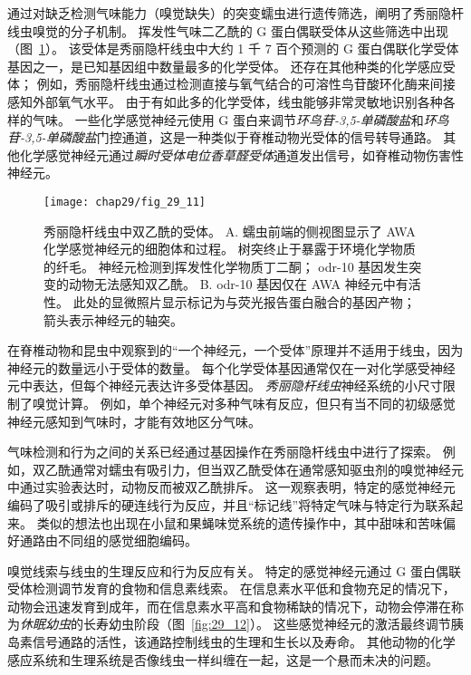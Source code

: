通过对缺乏检测气味能力（嗅觉缺失）的突变蠕虫进行遗传筛选，阐明了秀丽隐杆线虫嗅觉的分子机制。
挥发性气味二乙酰的 G 蛋白偶联受体从这些筛选中出现（图~\ref{fig:29_11}）。
该受体是秀丽隐杆线虫中大约 1 千 7 百个预测的 G 蛋白偶联化学受体基因之一，是已知基因组中数量最多的化学受体。
还存在其他种类的化学感应受体；
例如，秀丽隐杆线虫通过检测直接与氧气结合的可溶性鸟苷酸环化酶来间接感知外部氧气水平。
由于有如此多的化学受体，线虫能够非常灵敏地识别各种各样的气味。
一些化学感觉神经元使用 G 蛋白来调节\textit{环鸟苷-3,5-单磷酸盐}和\textit{环鸟苷-3,5-单磷酸盐}门控通道，这是一种类似于脊椎动物光受体的信号转导通路。
其他化学感觉神经元通过\textit{瞬时受体电位香草醛受体}通道发出信号，如脊椎动物伤害性神经元。


\begin{figure}[htbp]
	\centering
	\texttt{[image: chap29/fig\_29\_11]}
	\caption{秀丽隐杆线虫中双乙酰的受体。
		A. 蠕虫前端的侧视图显示了 AWA 化学感觉神经元的细胞体和过程。
		树突终止于暴露于环境化学物质的纤毛。
		神经元检测到挥发性化学物质丁二酮；
		odr-10 基因发生突变的动物无法感知双乙酰。
		B. odr-10 基因仅在 AWA 神经元中有活性。
		此处的显微照片显示标记为与荧光报告蛋白融合的基因产物；
		箭头表示神经元的轴突。}
	\label{fig:29_11}
\end{figure}


在脊椎动物和昆虫中观察到的“一个神经元，一个受体”原理并不适用于线虫，因为神经元的数量远小于受体的数量。
每个化学受体基因通常仅在一对化学感受神经元中表达，但每个神经元表达许多受体基因。
\textit{秀丽隐杆线虫}神经系统的小尺寸限制了嗅觉计算。
例如，单个神经元对多种气味有反应，但只有当不同的初级感觉神经元感知到气味时，才能有效地区分气味。


气味检测和行为之间的关系已经通过基因操作在秀丽隐杆线虫中进行了探索。
例如，双乙酰通常对蠕虫有吸引力，但当双乙酰受体在通常感知驱虫剂的嗅觉神经元中通过实验表达时，动物反而被双乙酰排斥。
这一观察表明，特定的感觉神经元编码了吸引或排斥的硬连线行为反应，并且“标记线”将特定气味与特定行为联系起来。
类似的想法也出现在小鼠和果蝇味觉系统的遗传操作中，其中甜味和苦味偏好通路由不同组的感觉细胞编码。


嗅觉线索与线虫的生理反应和行为反应有关。
特定的感觉神经元通过 G 蛋白偶联受体检测调节发育的食物和信息素线索。
在信息素水平低和食物充足的情况下，动物会迅速发育到成年，而在信息素水平高和食物稀缺的情况下，动物会停滞在称为\textit{休眠幼虫}的长寿幼虫阶段（图~\ref{fig:29_12}）。
这些感觉神经元的激活最终调节胰岛素信号通路的活性，该通路控制线虫的生理和生长以及寿命。
其他动物的化学感应系统和生理系统是否像线虫一样纠缠在一起，这是一个悬而未决的问题。


